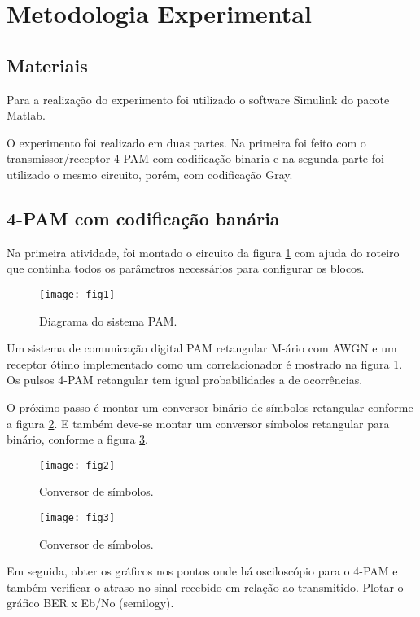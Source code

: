 \newpage
\section{Metodologia Experimental}

\subsection{Materiais}

Para a realização do experimento foi utilizado o software Simulink do pacote Matlab.

O experimento foi realizado em duas partes. Na primeira foi feito com o transmissor/receptor 4-PAM com codificação binaria e na segunda parte foi utilizado o mesmo circuito, porém, com codificação Gray.

\subsection{4-PAM com codificação banária}
Na primeira atividade, foi montado o circuito da figura \ref{fig:1} com ajuda do roteiro que continha todos os parâmetros necessários para configurar os blocos.

\begin{figure}[H]
    \centering
    \texttt{[image: fig1]}
    \caption{Diagrama do sistema PAM.}
    \label{fig:1}
\end{figure}

Um sistema de comunicação digital PAM retangular M-ário com AWGN e um receptor ótimo implementado como um correlacionador é mostrado na figura \ref{fig:1}. Os pulsos 4-PAM retangular tem igual probabilidades a de ocorrências.

O próximo passo é montar um conversor binário de símbolos retangular conforme a figura \ref{fig:2}.
E também deve-se montar um conversor símbolos retangular para binário, conforme a figura \ref{fig:3}.

\begin{figure}[H]
    \centering
    \texttt{[image: fig2]}
    \caption{Conversor de símbolos.}
    \label{fig:2}
\end{figure}

\begin{figure}[H]
    \centering
    \texttt{[image: fig3]}
    \caption{Conversor de símbolos.}
    \label{fig:3}
\end{figure}

Em seguida, obter os gráficos nos pontos onde há osciloscópio  para o 4-PAM e também verificar o atraso no sinal recebido em relação ao transmitido. Plotar o gráfico BER x Eb/No (semilogy). 

